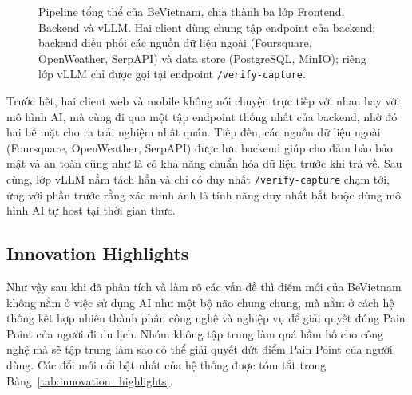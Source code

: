 \begin{figure}[H]
\caption{Pipeline tổng thể của BeVietnam, chia thành ba lớp Frontend,
Backend và vLLM. Hai client dùng chung tập endpoint của backend; backend
điều phối các nguồn dữ liệu ngoài (Foursquare, OpenWeather, SerpAPI) và
data store (PostgreSQL, MinIO); riêng lớp vLLM chỉ được gọi tại endpoint
\texttt{/verify-capture}.}
\label{fig:system_pipeline}
\end{figure}

Trước hết, hai client web và mobile không nói
chuyện trực tiếp với nhau hay với mô hình AI, mà cùng đi qua một tập
endpoint thống nhất của backend, nhờ đó hai bề mặt cho ra trải nghiệm
nhất quán. Tiếp đến, các nguồn dữ liệu ngoài (Foursquare, OpenWeather,
SerpAPI) được lưu backend giúp cho đảm bảo bảo mật và an toàn cũng như là có khả năng
chuẩn hóa dữ liệu trước khi trả về. Sau cùng, lớp vLLM
nằm tách hẳn và chỉ có duy nhất \texttt{/verify-capture} chạm tới, ứng với phần trước rằng xác minh ảnh là tính năng duy nhất bắt
buộc dùng mô hình AI tự host tại thời gian thực.

\subsection{Innovation Highlights}
\contrib
Như vậy sau khi đã phân tích và làm rõ các vấn đề thì điểm mới của BeVietnam không nằm ở việc sử dụng AI như một bộ não
chung chung, mà nằm ở cách hệ thống kết hợp nhiều thành phần công nghệ và
nghiệp vụ để giải quyết đúng Pain Point của người đi du lịch. Nhóm không tập trung
làm quá hầm hố cho công nghệ mà sẽ tập trung làm sao có thể giải quyết dứt điểm
Pain Point của người dùng. Các đổi mới
nổi bật nhất của hệ thống được tóm tắt trong
Bảng~\ref{tab:innovation_highlights}.

